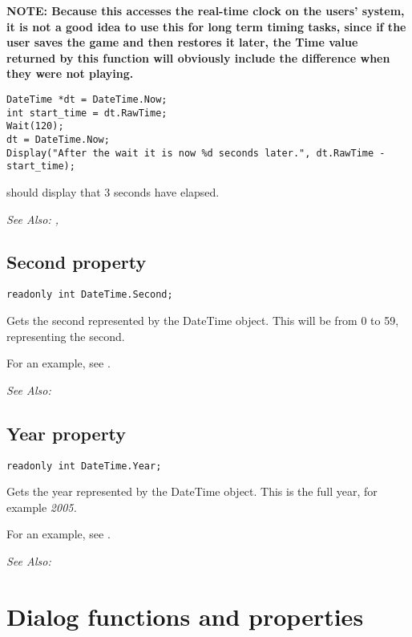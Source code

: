 \bf{NOTE:} Because this accesses the real-time clock on the users' system, it is not
a good idea to use this for long term timing tasks, since if the user saves the game and
then restores it later, the Time value returned by this function will obviously include
the difference when they were not playing.

\begin{verbatim}
DateTime *dt = DateTime.Now;
int start_time = dt.RawTime;
Wait(120);
dt = DateTime.Now;
Display("After the wait it is now %d seconds later.", dt.RawTime - start_time);
\end{verbatim}
should display that 3 seconds have elapsed.

\it{See Also:} , 


\subsection{Second property}\label{DateTime.Second}%

\begin{verbatim}
readonly int DateTime.Second;
\end{verbatim}
Gets the second represented by the DateTime object. This will be from 0 to 59,
representing the second.

For an example, see .

\it{See Also:} 


\subsection{Year property}\label{DateTime.Year}%

\begin{verbatim}
readonly int DateTime.Year;
\end{verbatim}
Gets the year represented by the DateTime object. This is the full year,
for example \it{2005}.

For an example, see .

\it{See Also:} 


\section{Dialog functions and properties}%


